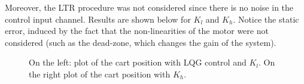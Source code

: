 Moreover, the LTR procedure was not considered since there is no noise in the control input channel.
Results are shown below for $K_l$ and $K_h$. Notice the static error, induced by the fact that the non-linearities of the motor were not considered (such as the dead-zone, which changes the gain of the system).\\

  \begin{figure}[!tbh]
  \centering
  \hfill
  \caption{On the left: plot of the cart position with LQG control and $K_l$. On the right plot of the cart position with $K_h$.}
    \label{fig:lqg1dof}
\end{figure}